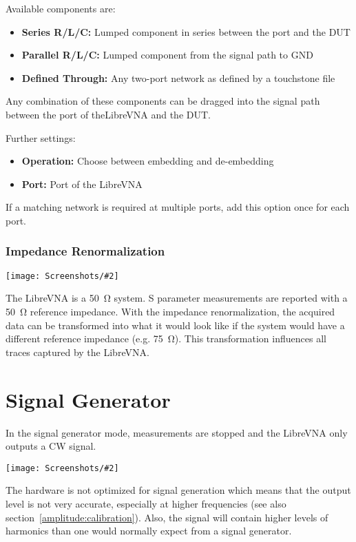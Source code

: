\documentclass[a4paper,11pt]{article}
\newcommand{\vna}{LibreVNA}
\newcommand{\screenshot}[2]{\begin{center}
\texttt{[image: Screenshots/\#2]}
\end{center}}
\begin{document}
Available components are:
\begin{itemize}
\item \textbf{Series R/L/C:} Lumped component in series between the port and the DUT
\item \textbf{Parallel R/L/C:} Lumped component from the signal path to GND
\item \textbf{Defined Through:} Any two-port network as defined by a touchstone file
\end{itemize}
Any combination of these components can be dragged into the signal path between the port of the\vna{} and the DUT.

Further settings:
\begin{itemize}
\item \textbf{Operation:} Choose between embedding and de-embedding
\item \textbf{Port:} Port of the \vna{}
\end{itemize}
If a matching network is required at multiple ports, add this option once for each port.

\subsubsection{Impedance Renormalization}
\screenshot{0.4}{DeembeddingImpedanceRenormalization.png}
The \vna{} is a \SI{50}{\ohm} system. S parameter measurements are reported with a \SI{50}{\ohm} reference impedance. With the impedance renormalization, the acquired data can be transformed into what it would look like if the system would have a different reference impedance (e.g. \SI{75}{\ohm}). This transformation influences all traces captured by the \vna{}.


\section{Signal Generator}
In the signal generator mode, measurements are stopped and the \vna{} only outputs a CW signal.
\screenshot{0.8}{Signalgenerator.png}
The hardware is not optimized for signal generation which means that the output level is not very accurate, especially at higher frequencies (see also section~\ref{amplitude:calibration}). Also, the signal will contain higher levels of harmonics than one would normally expect from a signal generator.
\end{document}
